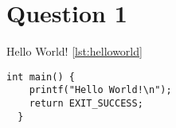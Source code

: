 \section{Question 1}\label{question-1}

Hello World! \ref{lst:helloworld}

\begin{lstlisting}[caption=Hello World,label=lst:helloworld]
  int main() {
    printf("Hello World!\n");
    return EXIT_SUCCESS;
  }
\end{lstlisting}
